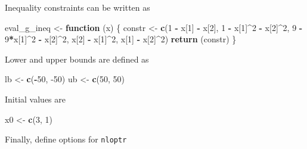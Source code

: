 \documentclass[onecolumn]{article}
\newenvironment{Shaded}{\begin{snugshade}}{\end{snugshade}}
\newcommand{\KeywordTok}[1]{\textcolor[rgb]{0.13,0.29,0.53}{\textbf{#1}}}
\newcommand{\DecValTok}[1]{\textcolor[rgb]{0.00,0.00,0.81}{#1}}
\newcommand{\StringTok}[1]{\textcolor[rgb]{0.31,0.60,0.02}{#1}}
\newcommand{\ControlFlowTok}[1]{\textcolor[rgb]{0.13,0.29,0.53}{\textbf{#1}}}
\newcommand{\OperatorTok}[1]{\textcolor[rgb]{0.81,0.36,0.00}{\textbf{#1}}}
\newcommand{\NormalTok}[1]{#1}
\begin{document}
Inequality constraints can be written as

\begin{Shaded}
\begin{Highlighting}[]
\NormalTok{eval_g_ineq <-}\StringTok{ }\ControlFlowTok{function}\NormalTok{ (x) \{}
\NormalTok{    constr <-}\StringTok{ }\KeywordTok{c}\NormalTok{(}\DecValTok{1} \OperatorTok{-}\StringTok{ }\NormalTok{x[}\DecValTok{1}\NormalTok{] }\OperatorTok{-}\StringTok{ }\NormalTok{x[}\DecValTok{2}\NormalTok{], }
                \DecValTok{1} \OperatorTok{-}\StringTok{ }\NormalTok{x[}\DecValTok{1}\NormalTok{]}\OperatorTok{^}\DecValTok{2} \OperatorTok{-}\StringTok{ }\NormalTok{x[}\DecValTok{2}\NormalTok{]}\OperatorTok{^}\DecValTok{2}\NormalTok{,}
                \DecValTok{9} \OperatorTok{-}\StringTok{ }\DecValTok{9}\OperatorTok{*}\NormalTok{x[}\DecValTok{1}\NormalTok{]}\OperatorTok{^}\DecValTok{2} \OperatorTok{-}\StringTok{ }\NormalTok{x[}\DecValTok{2}\NormalTok{]}\OperatorTok{^}\DecValTok{2}\NormalTok{,}
\NormalTok{                x[}\DecValTok{2}\NormalTok{] }\OperatorTok{-}\StringTok{ }\NormalTok{x[}\DecValTok{1}\NormalTok{]}\OperatorTok{^}\DecValTok{2}\NormalTok{,}
\NormalTok{                x[}\DecValTok{1}\NormalTok{] }\OperatorTok{-}\StringTok{ }\NormalTok{x[}\DecValTok{2}\NormalTok{]}\OperatorTok{^}\DecValTok{2}\NormalTok{)}
    \KeywordTok{return}\NormalTok{ (constr)}
\NormalTok{\}}
\end{Highlighting}
\end{Shaded}

Lower and upper bounds are defined as

\begin{Shaded}
\begin{Highlighting}[]
\NormalTok{lb <-}\StringTok{ }\KeywordTok{c}\NormalTok{(}\OperatorTok{-}\DecValTok{50}\NormalTok{, }\DecValTok{-50}\NormalTok{)}
\NormalTok{ub <-}\StringTok{ }\KeywordTok{c}\NormalTok{(}\DecValTok{50}\NormalTok{, }\DecValTok{50}\NormalTok{)}
\end{Highlighting}
\end{Shaded}

Initial values are

\begin{Shaded}
\begin{Highlighting}[]
\NormalTok{x0 <-}\StringTok{ }\KeywordTok{c}\NormalTok{(}\DecValTok{3}\NormalTok{, }\DecValTok{1}\NormalTok{)}
\end{Highlighting}
\end{Shaded}

Finally, define options for \texttt{nloptr}
\end{document}
